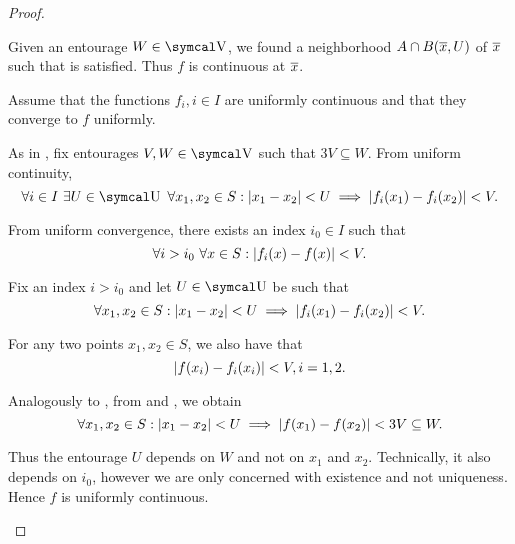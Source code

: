 \begin{proof}
\begin{description}
    Given an entourage \( W \in \CV \), we found a neighborhood \( A \cap B(\overline{x}, U) \) of \( \overline{x} \) such that  is satisfied. Thus \( f \) is continuous at \( \overline{x} \).

     Assume that the functions \( f_i, i \in I \) are uniformly continuous and that they converge to \( f \) uniformly.

    As in , fix entourages \( V, W \in \CV \) such that \( 3V \subseteq W \). From uniform continuity,
    \begin{equation*}
      \forall i \in I \ \exists U \in \CU \ \forall x_1, x_2 \in S : \Abs{x_1 - x_2} < U \implies \Abs{f_i(x_1) - f_i(x_2)} < V.
    \end{equation*}

    From uniform convergence, there exists an index \( i_0 \in I \) such that
    \begin{equation*}
      \forall i > i_0 \ \forall x \in S : \left\vert f_i(x) - f(x) \right\vert < V.
    \end{equation*}

    Fix an index \( i > i_0 \) and let \( U \in \CU \) be such that
    \begin{equation}\label{def:uniform_limit_of_continuous_functions/uniform/continuity}
      \forall x_1, x_2 \in S : \left\vert x_1 - x_2 \right\vert < U \implies \left\vert f_i(x_1) - f_i(x_2) \right\vert < V.
    \end{equation}

    For any two points \( x_1, x_2 \in S \), we also have that
    \begin{equation}\label{def:uniform_limit_of_continuous_functions/uniform/convergence}
      \left\vert f(x_i) - f_i(x_i) \right\vert < V, i = 1, 2.
    \end{equation}

    Analogously to , from  and , we obtain
    \begin{equation*}
      \forall x_1, x_2 \in S : \left\vert x_1 - x_2 \right\vert < U \implies \left\vert f(x_1) - f(x_2) \right\vert < 3V \subseteq W.
    \end{equation*}

    Thus the entourage \( U \) depends on \( W \) and not on \( x_1 \) and \( x_2 \). Technically, it also depends on \( i_0 \), however we are only concerned with existence and not uniqueness. Hence \( f \) is uniformly continuous.
  \end{description}
\end{proof}

